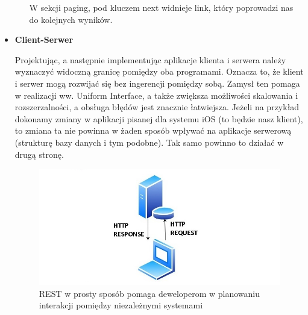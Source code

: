 \documentclass[oneside,polski,logo,indent]{amuthesis}
\begin{document}
\begin{itemize}
\begin{itemize}
W sekcji paging, pod kluczem next widnieje link, który poprowadzi nas do kolejnych wyników.\newline 
\end{itemize}

\item \textbf{Client-Serwer}

Projektując, a następnie implementując aplikacje klienta i serwera należy wyznaczyć widoczną granicę pomiędzy oba programami. Oznacza to, że klient i serwer mogą rozwijać się bez ingerencji pomiędzy sobą. Zamysł ten pomaga w realizacji ww. Uniform Interface, a także zwiększa możliwości skalowania i rozszerzalności, a obsługa błędów jest znacznie łatwiejsza. Jeżeli na przykład dokonamy zmiany w aplikacji pisanej dla systemu iOS (to będzie nasz klient), to zmiana ta nie powinna w żaden sposób wpływać na aplikacje serwerową (strukturę bazy danych i tym podobne). Tak samo powinno to działać w drugą stronę. 


\begin{figure}[H]
\centering
\includegraphics[width=14cm]{rest.jpg}
\caption{REST w prosty sposób pomaga deweloperom w planowaniu interakcji pomiędzy niezależnymi systemami}
\label{REST}
\end{figure}



\end{itemize}
\end{document}
